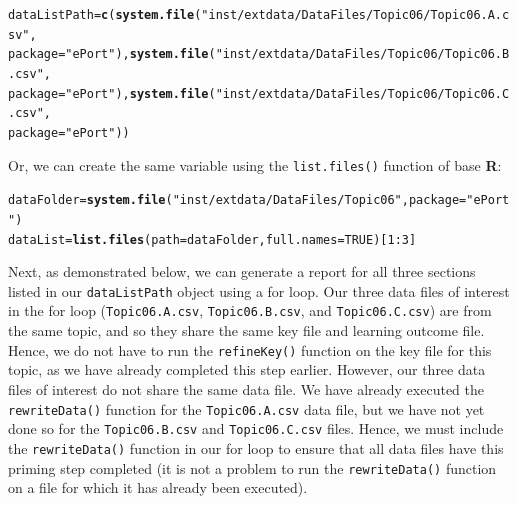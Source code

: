 \documentclass{article}\usepackage[]{graphicx}\usepackage[]{color}
\makeatletter
\newcommand{\hlnum}[1]{\textcolor[rgb]{0.686,0.059,0.569}{#1}}%
\newcommand{\hlstr}[1]{\textcolor[rgb]{0.192,0.494,0.8}{#1}}%
\newcommand{\hlopt}[1]{\textcolor[rgb]{0,0,0}{#1}}%
\newcommand{\hlstd}[1]{\textcolor[rgb]{0.345,0.345,0.345}{#1}}%
\newcommand{\hlkwb}[1]{\textcolor[rgb]{0.69,0.353,0.396}{#1}}%
\newcommand{\hlkwc}[1]{\textcolor[rgb]{0.333,0.667,0.333}{#1}}%
\newcommand{\hlkwd}[1]{\textcolor[rgb]{0.737,0.353,0.396}{\textbf{#1}}}%
\newenvironment{kframe}{%
 \def\at@end@of@kframe{}%
 \ifinner\ifhmode%
  \def\at@end@of@kframe{\end{minipage}}%
  \begin{minipage}{\columnwidth}%
 \fi\fi%
 \def\FrameCommand##1{\hskip\@totalleftmargin \hskip-\fboxsep
 \colorbox{shadecolor}{##1}\hskip-\fboxsep
     \hskip-\linewidth \hskip-\@totalleftmargin \hskip\columnwidth}%
 \MakeFramed {\advance\hsize-\width
   \@totalleftmargin\z@ \linewidth\hsize
   \@setminipage}}%
 {\par\unskip\endMakeFramed%
 \at@end@of@kframe}
\newenvironment{knitrout}{}{} %
\numberwithin{equation}{section} %
\makeatother
\begin{document}
\begin{knitrout}
\color{fgcolor}\begin{kframe}
\begin{alltt}
\hlstd{dataListPath} \hlkwb{=} \hlkwd{c}\hlstd{(}\hlkwd{system.file}\hlstd{(}\hlstr{"inst/extdata/DataFiles/Topic06/Topic06.A.csv"}\hlstd{,}
  \hlkwc{package} \hlstd{=} \hlstr{"ePort"}\hlstd{),} \hlkwd{system.file}\hlstd{(}\hlstr{"inst/extdata/DataFiles/Topic06/Topic06.B.csv"}\hlstd{,}
  \hlkwc{package} \hlstd{=} \hlstr{"ePort"}\hlstd{),} \hlkwd{system.file}\hlstd{(}\hlstr{"inst/extdata/DataFiles/Topic06/Topic06.C.csv"}\hlstd{,}
  \hlkwc{package} \hlstd{=} \hlstr{"ePort"}\hlstd{))}
\end{alltt}
\end{kframe}
\end{knitrout}

Or, we can create the same variable using the \texttt{list.files()} function of base \textbf{\textsf{R}}: \\

\begin{knitrout}
\color{fgcolor}\begin{kframe}
\begin{alltt}
\hlstd{dataFolder} \hlkwb{=} \hlkwd{system.file}\hlstd{(}\hlstr{"inst/extdata/DataFiles/Topic06"}\hlstd{,} \hlkwc{package}\hlstd{=}\hlstr{"ePort"}\hlstd{)}
\hlstd{dataList} \hlkwb{=} \hlkwd{list.files}\hlstd{(}\hlkwc{path} \hlstd{= dataFolder,} \hlkwc{full.names}\hlstd{=}\hlnum{TRUE}\hlstd{)[}\hlnum{1}\hlopt{:}\hlnum{3}\hlstd{]}
\end{alltt}
\end{kframe}
\end{knitrout}

Next, as demonstrated below, we can generate a report for all three sections listed in our \texttt{dataListPath} object using a for loop. Our three data files of interest in the for loop (\texttt{Topic06.A.csv}, \texttt{Topic06.B.csv}, and \texttt{Topic06.C.csv}) are from the same topic, and so they share the same key file and learning outcome file. Hence, we do not have to run the \texttt{refineKey()} function on the key file for this topic, as we have already completed this step earlier. However, our three data files of interest do not share the same data file. We have already executed the \texttt{rewriteData()} function for the \texttt{Topic06.A.csv} data file, but we have not yet done so for the \texttt{Topic06.B.csv} and \texttt{Topic06.C.csv} files. Hence, we must include the \texttt{rewriteData()} function in our for loop to ensure that all data files have this priming step completed (it is not a problem to run the \texttt{rewriteData()} function on a file for which it has already been executed). \\
\end{document}
